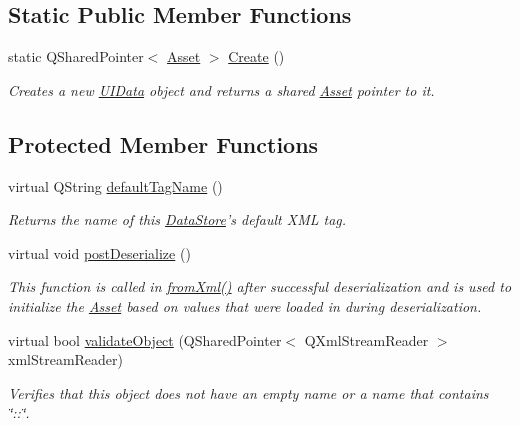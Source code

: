 \subsection*{Static Public Member Functions}
\begin{DoxyCompactItemize}
\item 
\hypertarget{class_picto_1_1_u_i_data_a0883259c5bdcf55bcb12b253aff5f9d3}{static Q\-Shared\-Pointer$<$ \hyperlink{class_picto_1_1_asset}{Asset} $>$ \hyperlink{class_picto_1_1_u_i_data_a0883259c5bdcf55bcb12b253aff5f9d3}{Create} ()}\label{class_picto_1_1_u_i_data_a0883259c5bdcf55bcb12b253aff5f9d3}

\begin{DoxyCompactList}\small\item\em Creates a new \hyperlink{class_picto_1_1_u_i_data}{U\-I\-Data} object and returns a shared \hyperlink{class_picto_1_1_asset}{Asset} pointer to it. \end{DoxyCompactList}\end{DoxyCompactItemize}
\subsection*{Protected Member Functions}
\begin{DoxyCompactItemize}
\item 
virtual Q\-String \hyperlink{class_picto_1_1_u_i_data_a56f2dd7a596d619946b94afeef8299f0}{default\-Tag\-Name} ()
\begin{DoxyCompactList}\small\item\em Returns the name of this \hyperlink{class_picto_1_1_data_store}{Data\-Store}'s default X\-M\-L tag. \end{DoxyCompactList}\item 
virtual void \hyperlink{class_picto_1_1_u_i_data_a5c9efa47c9f2e57d7c03a5a8f5169a98}{post\-Deserialize} ()
\begin{DoxyCompactList}\small\item\em This function is called in \hyperlink{class_picto_1_1_asset_a8bed4da09ecb1c07ce0dab313a9aba67}{from\-Xml()} after successful deserialization and is used to initialize the \hyperlink{class_picto_1_1_asset}{Asset} based on values that were loaded in during deserialization. \end{DoxyCompactList}\item 
\hypertarget{class_picto_1_1_u_i_data_aaf5dd8851655e8d181441364d6125836}{virtual bool \hyperlink{class_picto_1_1_u_i_data_aaf5dd8851655e8d181441364d6125836}{validate\-Object} (Q\-Shared\-Pointer$<$ Q\-Xml\-Stream\-Reader $>$ xml\-Stream\-Reader)}\label{class_picto_1_1_u_i_data_aaf5dd8851655e8d181441364d6125836}

\begin{DoxyCompactList}\small\item\em Verifies that this object does not have an empty name or a name that contains \char`\"{}\-::\char`\"{}. \end{DoxyCompactList}\end{DoxyCompactItemize}
